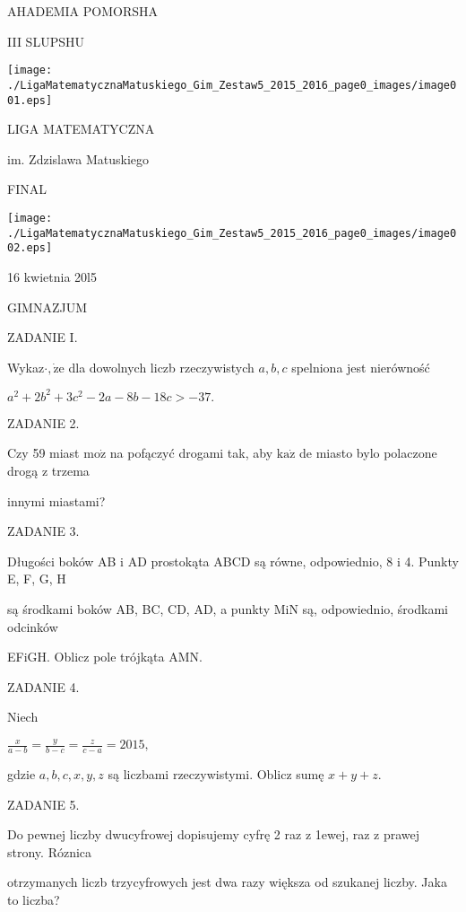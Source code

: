 \documentclass[a4paper,12pt]{article}
\begin{document}
AHADEMIA POMORSHA

III SLUPSHU
\begin{center}
\texttt{[image: ./LigaMatematycznaMatuskiego\_Gim\_Zestaw5\_2015\_2016\_page0\_images/image001.eps]}
\end{center}
LIGA MATEMATYCZNA

im. Zdzislawa Matuskiego

FINAL
\begin{center}
\texttt{[image: ./LigaMatematycznaMatuskiego\_Gim\_Zestaw5\_2015\_2016\_page0\_images/image002.eps]}
\end{center}
16 kwietnia 20l5

GIMNAZJUM

ZADANIE I.

Wykaz$\cdot, \dot{\mathrm{z}}\mathrm{e}$ dla dowolnych liczb rzeczywistych $a, b, c$ spelniona jest nierówność

$a^{2}+2b^{2}+3c^{2}-2a-8b-18c>-37.$

ZADANIE 2.

Czy 59 miast $\mathrm{m}\mathrm{o}\dot{\mathrm{z}}$ na pofączyć drogami tak, aby $\mathrm{k}\mathrm{a}\dot{\mathrm{z}}$ de miasto bylo polaczone drogą z trzema

innymi miastami?

ZADANIE 3.

Długości boków AB i AD prostokąta ABCD są równe, odpowiednio, 8 i 4. Punkty E, F, G, H

są środkami boków AB, BC, CD, AD, a punkty MiN są, odpowiednio, środkami odcinków

EFiGH. Oblicz pole trójkąta AMN.

ZADANIE 4.

Niech

$\displaystyle \frac{x}{a-b}=\frac{y}{b-c}=\frac{z}{c-a}=2015,$

gdzie $a, b, c, x, y, z$ są liczbami rzeczywistymi. Oblicz sumę $x+y+z.$

ZADANIE 5.

Do pewnej liczby dwucyfrowej dopisujemy cyfrę 2 raz z 1ewej, raz z prawej strony. Róznica

otrzymanych liczb trzycyfrowych jest dwa razy większa od szukanej liczby. Jaka to liczba?
\end{document}
